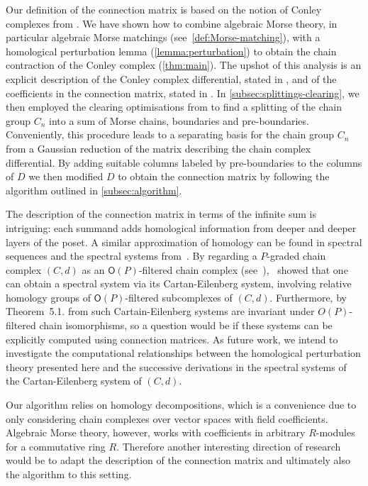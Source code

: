 \documentclass[11pt, table, nothms]{amsart}
\theoremstyle{definition}
\begin{document}
{Our definition of the connection matrix is based on the notion of Conley complexes from \cite[Def.~4.23]{harker2021}. We have shown how to combine algebraic Morse theory, in particular algebraic Morse matchings (see~\cref{def:Morse-matching}), with a homological perturbation lemma (\cref{lemma:perturbation}) to obtain the chain contraction of the Conley complex (\cref{thm:main}). 
The upshot of this analysis is an explicit description of the Conley complex differential, stated in , and of the coefficients in the connection matrix, stated in . 
In \cref{subsec:splittings-clearing}, we then employed the clearing optimisations from \cite{Chen2011,Bauer2014ClearChunks} to find a splitting of the chain group $C_n$ into a sum of Morse chains, boundaries and pre-boundaries. Conveniently, this procedure leads to a separating basis for the chain group $C_n$ from a Gaussian reduction of the matrix describing the chain complex differential. 
By adding suitable columns labeled by pre-boundaries to the columns of $D$ we then modified $D$ to obtain the connection matrix by following the algorithm outlined in \cref{subsec:algorithm}.

The description of the connection matrix in terms of the infinite sum %
is intriguing: each summand adds homological information from deeper and deeper layers of the poset. A similar approximation of homology can be found in spectral sequences and the spectral systems from~\cite{Matschke22}. 
By regarding a $P$-graded chain complex $(C,d)$ as an $\mathsf{O}(P)$-filtered chain complex (see~),~\cite{spendlove2025graded} showed that one can obtain a spectral system via its Cartan-Eilenberg system, involving relative homology groups of $\mathsf{O}(P)$-filtered subcomplexes of $(C,d)$. 
Furthermore, by Theorem~5.1. from \cite{spendlove2025graded} such Cartain-Eilenberg systems are invariant under $O(P)$-filtered chain isomorphisms, so a question would be if these systems can be explicitly computed using connection matrices.
As future work, we intend to investigate the computational relationships between the homological perturbation theory presented here and the successive derivations in the spectral systems of the Cartan-Eilenberg system of $(C,d)$. 

Our algorithm relies on homology decompositions, which is a convenience due to only considering chain complexes over vector spaces with field coefficients. Algebraic Morse theory, however, works with coefficients in arbitrary $R$-modules for a commutative ring $R$. Therefore another interesting direction of research would be to adapt the description of the connection matrix and ultimately also the algorithm to this setting. 

}
\end{document}
